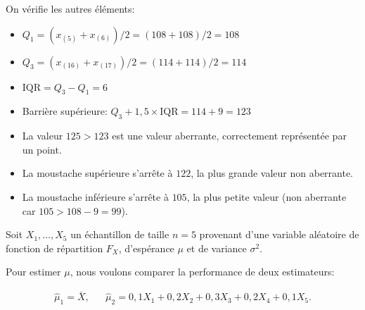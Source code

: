 \begin{questions}
\begin{solution}
    On vérifie les autres éléments:
    \begin{itemize}
        \item $Q_1 = (x_{(5)}+x_{(6)})/2=(108+108)/2=108$ \checkmark
        \item $Q_3 = (x_{(16)}+x_{(17)})/2=(114+114)/2=114$ \checkmark
        \item $\text{IQR}=Q_3 - Q_1 = 6$
        \item Barrière supérieure: $Q_3+1{,}5\times\text{IQR}=114+9=123$
        \item La valeur $125 > 123$ est une valeur aberrante, correctement représentée par un point. \checkmark
        \item La moustache supérieure s'arrête à $122$, la plus grande valeur non aberrante. \checkmark
        \item La moustache inférieure s'arrête à $105$, la plus petite valeur (non aberrante car $105 > 108-9=99$). \checkmark
    \end{itemize}
\end{solution}

    \pageblanche

    \question Soit $X_1,\hdots,X_5$ un échantillon de taille $n=5$ provenant d'une variable aléatoire de fonction de répartition $F_X$, d'espérance $\mu$ et de variance $\sigma^2$.

    Pour estimer $\mu$, nous voulons comparer la performance de deux estimateurs:

    \begin{align*}
        \hat{\mu}_1=\overline{X}, & & \hat{\mu}_2=0{,}1X_1+0{,}2X_2+0{,}3X_3+0{,}2X_4+0{,}1X_5.
    \end{align*}

\end{questions}
